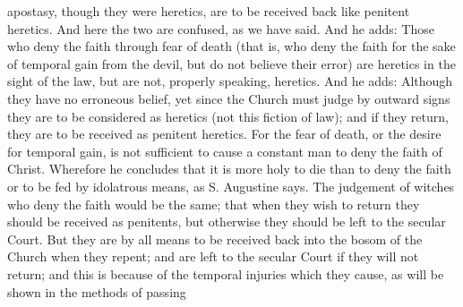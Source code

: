        apostasy, though they were heretics, are to be received back like penitent heretics. And here
       the two are confused, as we have said. And he adds: Those who deny the faith through fear
       of death (that is, who deny the faith for the sake of temporal gain from the devil, but do not
       believe their error) are heretics in the sight of the law, but are not, properly speaking,
       heretics. And he adds: Although they have no erroneous belief, yet since the Church must
       judge by outward signs they are to be considered as heretics (not this fiction of law); and if
       they return, they are to be received as penitent heretics. For the fear of death, or the desire
       for temporal gain, is not sufficient to cause a constant man to deny the faith of Christ.
       Wherefore he concludes that it is more holy to die than to deny the faith or to be fed by
       idolatrous means, as S. Augustine says.
             The judgement of witches who deny the faith would be the same; that when they wish
       to return they should be received as penitents, but otherwise they should be left to the
       secular Court. But they are by all means to be received back into the bosom of the Church
       when they repent; and are left to the secular Court if they will not return; and this is because
       of the temporal injuries which they cause, as will be shown in the methods of passing

